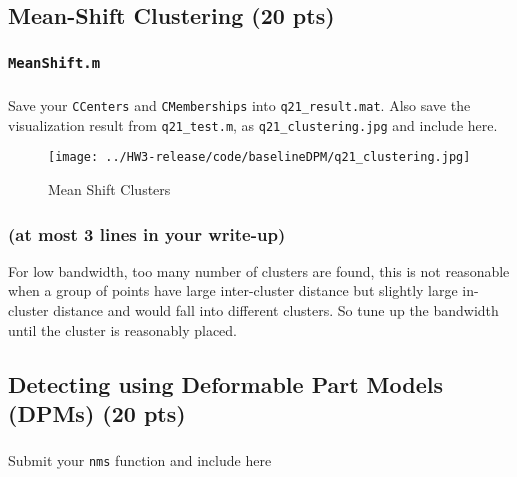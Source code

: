\documentclass[12pt]{article}
\newcounter{list}
\begin{document}
\renewcommand{\thesubsection}{\arabic{section}.\arabic{subsection}}

\subsection{Mean-Shift Clustering (20 pts)}

\subsubsection{\texttt{MeanShift.m}}



\subsubsection{}

Save your \texttt{CCenters} and \texttt{CMemberships} into \texttt{q21\_result.mat}.
Also save the visualization result from \texttt{q21\_test.m}, as \texttt{q21\_clustering.jpg} and include here.

\begin{figure}[H]
  \centering \texttt{[image: ../HW3-release/code/baselineDPM/q21\_clustering.jpg]}
  \caption{Mean Shift Clusters}
  \label{clusters}
\end{figure}


\subsubsection{(at most 3 lines in your write-up)}
\label{q:bandwidth}
For low bandwidth, too many number of clusters are found, this is not reasonable when a group of points have large inter-cluster distance but slightly large in-cluster distance and would fall into different clusters. So tune up the bandwidth until the cluster is reasonably placed.

\subsection{Detecting using Deformable Part Models (DPMs) (20 pts)}

\subsubsection{}

Submit your \texttt{nms} function and include here
\end{document}
